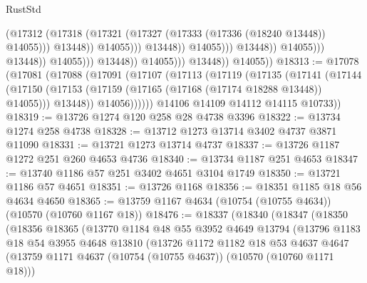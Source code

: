 \begin{lexlean}{RustStd}
\begin{coremodule}
                                                          (@17312
                                                            (@17318
                                                              (@17321
                                                                (@17327
                                                                  (@17333
                                                                    (@17336 (@18240 @13448))
                                                                    @14055)))
                                                              @13448))
                                                          @14055)))
                                                    @13448))
                                                @14055)))
                                          @13448))
                                      @14055)))
                                @13448))
                            @14055)))
                      @13448))
                  @14055)))
            @13448))
        @14055))
@18313 := @17078
    (@17081
      (@17088
        (@17091
          (@17107
            (@17113
              (@17119
                (@17135
                  (@17141
                    (@17144
                      (@17150
                        (@17153 (@17159 (@17165 (@17168 (@17174 @18288 @13448)) @14055)))
                        @13448))
                    @14056))))))
        @14106
        @14109
        @14112
        @14115
        @10733))
@18319 := @13726 @1274 @120 @258 @28 @4738 @3396
@18322 := @13734 @1274 @258 @4738
@18328 := @13712 @1273 @13714 @3402 @4737 @3871 @11090
@18331 := @13721 @1273 @13714 @4737
@18337 := @13726 @1187 @1272 @251 @260 @4653 @4736
@18340 := @13734 @1187 @251 @4653
@18347 := @13740 @1186 @57 @251 @3402 @4651 @3104 @1749
@18350 := @13721 @1186 @57 @4651
@18351 := @13726 @1168
@18356 := @18351 @1185 @18 @56 @4634 @4650
@18365 := @13759 @1167 @4634 (@10754 (@10755 @4634)) (@10570 (@10760 @1167 @18))
@18476 := @18337
    (@18340
      (@18347
        (@18350
          (@18356
            @18365
            (@13770
              @1184
              @48
              @55
              @3952
              @4649
              @13794
              (@13796
                @1183
                @18
                @54
                @3955
                @4648
                @13810
                (@13726
                  @1172
                  @1182
                  @18
                  @53
                  @4637
                  @4647
                  (@13759 @1171 @4637 (@10754 (@10755 @4637)) (@10570 (@10760 @1171 @18)))

\end{coremodule}
\end{lexlean}
